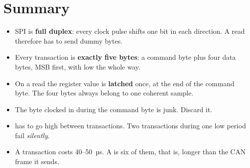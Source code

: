 \section*{Summary}

\begin{itemize}
  \item SPI is \textbf{full duplex}: every clock pulse shifts one bit in each direction. A read
    therefore has to send dummy bytes.
  \item Every transaction is \textbf{exactly five bytes}: a command byte plus four data bytes, MSB
    first, with  low the whole way.
  \item On a read the register value is \textbf{latched} once, at the end of the command byte. The
    four bytes always belong to one coherent sample.
  \item The byte clocked in during the command byte is junk. Discard it.
  \item {} has to go high between transactions. Two transactions during one low period fail
    \emph{silently}.
  \item A transaction costs 40--50~µs. A  is six of them, that is, longer than the
    CAN frame it sends.
\end{itemize}

